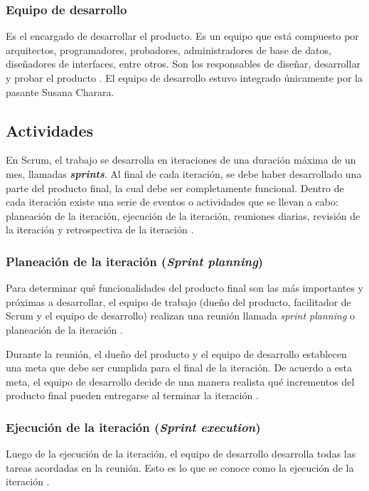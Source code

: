 \subsubsection{Equipo de desarrollo}

Es el encargado de desarrollar el producto. Es un equipo que está compuesto por arquitectos, programadores, probadores, administradores de base de datos, diseñadores de interfaces, entre otros. Son los responsables de diseñar, desarrollar y probar el producto \cite{SCRM12}. El equipo de desarrollo estuvo integrado únicamente por la pasante Susana Charara.

\subsection{Actividades}

En Scrum, el trabajo se desarrolla en iteraciones de una duración máxima de un mes, llamadas \textit{\textbf{sprints}}. Al final de cada iteración, se debe haber desarrollado una parte del producto final, la cual debe ser completamente funcional. Dentro de cada iteración existe una serie de eventos o actividades que se llevan a cabo: planeación de la iteración, ejecución de la iteración, reuniones diarias, revisión de la iteración y retrospectiva de la iteración \cite{SCRM12}.

\subsubsection{Planeación de la iteración (\textit{Sprint planning})}
Para determinar qué funcionalidades del producto final son las más importantes y próximas a desarrollar, el equipo de trabajo (dueño del producto, facilitador de Scrum y el equipo de desarrollo) realizan una reunión llamada \textit{sprint planning} o planeación de la iteración \cite{SCRM12}.

Durante la reunión, el dueño del producto y el equipo de desarrollo establecen una meta que debe ser cumplida para el final de la iteración. De acuerdo a esta meta, el equipo de desarrollo decide de una manera realista qué incrementos del producto final pueden entregarse al terminar la iteración \cite{SCRM12}.

\subsubsection{Ejecución de la iteración (\textit{Sprint execution})}

Luego de la ejecución de la iteración, el equipo de desarrollo desarrolla todas las tareas acordadas en la reunión. Esto es lo que se conoce como la ejecución de la iteración \cite{SCRM12}.

